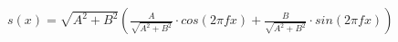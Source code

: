 $s(x) = \sqrt{A^2+B^2} (\frac{A}{\sqrt{A^2+B^2}} \cdot cos(2 \pi f x) + \frac{B}{\sqrt{A^2+B^2}} \cdot sin(2 \pi f x))$
